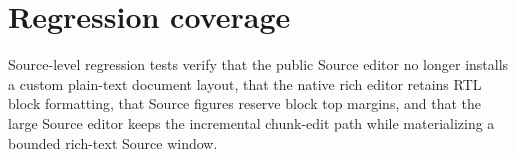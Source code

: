 \documentclass[a4paper]{article}
\begin{document}
   \section{Regression coverage}
   Source-level regression tests verify that the public Source editor no longer
   installs a custom plain-text document layout, that the native rich editor
   retains RTL block formatting, that Source figures reserve block top margins,
   and that the large Source editor keeps the incremental chunk-edit path while
   materializing a bounded rich-text Source window.

   
   
\end{document}
